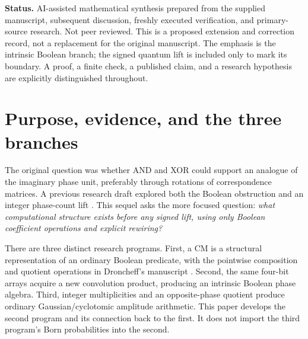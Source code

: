 \documentclass[11pt,a4paper]{article}
\theoremstyle{definition}\newtheorem{definition}[theorem]{Definition}
\theoremstyle{remark}\newtheorem{remark}[theorem]{Remark}
\numberwithin{equation}{section}
\begin{document}
\begin{titlepage}
\begin{minipage}{0.94\textwidth}
\begin{abstract}
Additional results identify a nilpotent bound on phase-oracle interactions, distinguish independent phase registers from shared coefficients, and connect CM parity to local Boolean nonlinearity. A typed CM-to-ANF compiler is derived and tested without truth-table materialization. Prior work on vector logic, modal models, M\"obius/Reed--Muller methods, polar transforms, decision diagrams, and XOR--AND compilation establishes the surrounding landscape. Potential value lies in certified rewrites, structured Boolean analysis, and auditable compilation; practical superiority and physical quantum equivalence are not established.
\end{abstract}
\end{minipage}
\vfill
\begin{minipage}{0.94\textwidth}\small
\textbf{Status.} AI-assisted mathematical synthesis prepared from the supplied manuscript, subsequent discussion, freshly executed verification, and primary-source research. Not peer reviewed. This is a proposed extension and correction record, not a replacement for the original manuscript. The emphasis is the intrinsic Boolean branch; the signed quantum lift is included only to mark its boundary. A proof, a finite check, a published claim, and a research hypothesis are explicitly distinguished throughout.
\end{minipage}
\end{titlepage}
\hypersetup{pageanchor=true}
\tableofcontents
\clearpage
{}

\section{Purpose, evidence, and the three branches}\label{sec:scope}
The original question was whether AND and XOR could support an analogue of the imaginary phase unit, preferably through rotations of correspondence matrices. A previous research draft explored both the Boolean obstruction and an integer phase-count lift \cite{previous}. This sequel asks the more focused question: \emph{what computational structure exists before any signed lift, using only Boolean coefficient operations and explicit rewiring?}

There are three distinct research programs. First, a CM is a structural representation of an ordinary Boolean predicate, with the pointwise composition and quotient operations in Droncheff's manuscript \cite{droncheff}. Second, the same four-bit arrays acquire a new convolution product, producing an intrinsic Boolean phase algebra. Third, integer multiplicities and an opposite-phase quotient produce ordinary Gaussian/cyclotomic amplitude arithmetic. This paper develops the second program and its connection back to the first. It does not import the third program's Born probabilities into the second.
\end{document}
